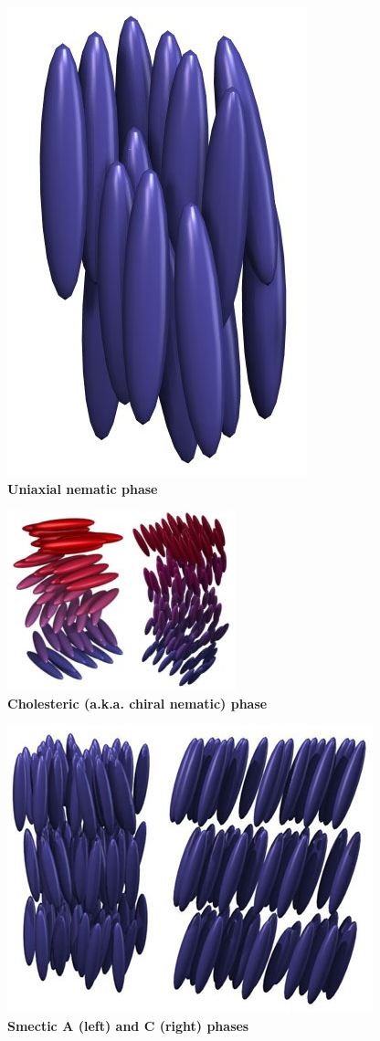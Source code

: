 \documentclass[twocolumn,aps,prl]{revtex4-1} %
\begin{document}
\begin{figure}
    \includegraphics[scale=0.3]{nematic.jpg}
    \caption{\textbf{Uniaxial nematic phase}}
    \label{fig:nematic}
\end{figure}

\begin{figure}
    \includegraphics[scale=0.8]{cholesteric.jpg}
    \caption{\textbf{Cholesteric (a.k.a. chiral nematic) phase}}
    \label{fig:cholesteric}
\end{figure}

\begin{figure}
    \includegraphics[scale=0.5]{smectic.jpg}
    \caption{\textbf{Smectic A (left) and C (right) phases}}
    \label{fig:smectic}
\end{figure}
\end{document}
